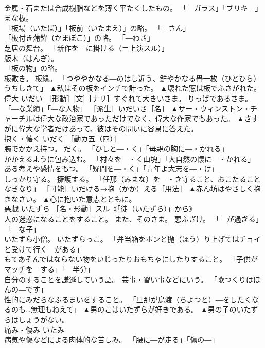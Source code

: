 \documentclass[8pt]{extreport}
\begin{document}
\begin{CJK}{UTF8}{min}
\\	金属・石または合成樹脂などを薄く平たくしたもの。 「―ガラス」「ブリキ―」 
\\	まな板。 
\\	「板場（いたば）」「板前（いたまえ）」の略。 「―さん」 
\\	「板付き蒲鉾（かまぼこ）」の略。 「―わさ」 
\\	芝居の舞台。 「新作を―に掛ける（＝上演スル）」 
\\	版木（はんぎ）。 
\\	「板の物」の略。 
\\	板敷き。 板縁。 「つややかなる―のはし近う、鮮やかなる畳一枚（ひとひら）うちしきて」	▲私はその板をインチで計った。 ▲壊れた窓は板でふさがれた。
\\	偉大	いだい	［形動］[文]［ナリ］すぐれて大きいさま。 りっぱであるさま。 「―な業績」「―な人物」 ［派生］いだいさ［名］	▲サー・ウィンストン・チャーチルは偉大な政治家であっただけでなく、偉大な作家でもあった。 ▲さすがに偉大な学者だけあって、彼はその問いに容易に答えた。
\\	抱く・懐く	いだく	［動カ五（四）］ 
\\	腕でかかえ持つ。 だく。 「ひしと―・く」「母親の胸に―・かれる」 
\\	かかえるように包み込む。 「村々を―・く山塊」「大自然の懐に―・かれる」 
\\	ある考えや感情をもつ。 「疑問を―・く」「青年よ大志を―・け」 
\\	しっかり守る。 擁護する。 「任那（みまな）を―・き守ること、おこたることなきなり」 ［可能］いだける→抱（かか）える［用法］	▲赤ん坊はやさしく抱きなさい。 ▲心に抱いた意志とともに。
\\	悪戯	いたずら	［名・形動］スル《「徒（いたずら）」から》 
\\	人の迷惑になることをすること。 また、そのさま。 悪ふざけ。 「―が過ぎる」「―な子」 
\\	いたずら小僧。 いたずらっこ。 「弁当箱をポンと抛（ほう）り上げてはチョイと受けて行く―がある」 
\\	もてあそんではならない物をいじったりおもちゃにしたりすること。 「子供がマッチを―する」「―半分」 
\\	自分のすることを謙遜していう語。 芸事・習い事などにいう。 「歌つくりはほんの―です」 
\\	性的にみだらなふるまいをすること。 「旦那が鳥渡（ちよつと）―をしたくなるのも…無理もねえて」	▲男のこはいたずらが好きである。 ▲男の子のいたずらはしょうがない。
\\	痛み・傷み	いたみ	
\\	病気や傷などによる肉体的な苦しみ。 「腰に―が走る」「傷の―」 

\end{CJK}
\end{document}
